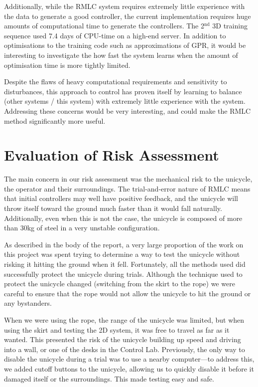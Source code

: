 \documentclass{IIBproject}
\begin{document}
Additionally, while the RMLC system requires extremely little experience with
the data to generate a good controller, the current implementation requires
huge amounts of computational time to generate the controllers. The
2$^\textrm{nd}$ 3D training sequence used 7.4 days of CPU-time on a high-end
server. In addition to optimisations to the training code such as
approximations of GPR, it would be interesting to investigate the how fast the
system learns when the amount of optimisation time is more tightly limited.

Despite the flaws of heavy computational requirements and sensitivity to
disturbances, this approach to control has proven itself by learning to
balance (other systems / this system) with extremely little experience with
the system. Addressing these concerns would be very interesting, and could
make the RMLC method significantly more useful.




\pagebreak
\appendix

\section{Evaluation of Risk Assessment}

The main concern in our risk assessment was the mechanical risk to the
unicycle, the operator and their surroundings. The trial-and-error nature of
RMLC means that initial controllers may well have positive feedback, and the
unicycle will throw itself toward the ground much faster than it would fall
naturally. Additionally, even when this is not the case, the unicycle is
composed of more than 30kg of steel in a very unstable configuration.

As described in the body of the report, a very large proportion of the work on
this project was spent trying to determine a way to test the unicycle without
risking it hitting the ground when it fell. Fortunately, all the methods used
did successfully protect the unicycle during trials. Although the technique
used to protect the unicycle changed (switching from the skirt to the rope) we
were careful to ensure that the rope would not allow the unicycle to hit the
ground or any bystanders.

When we were using the rope, the range of the unicycle was limited, but when
using the skirt and testing the 2D system, it was free to travel as far as it
wanted. This presented the risk of the unicycle building up speed and driving
into a wall, or one of the desks in the Control Lab. Previously, the only way
to disable the unicycle during a trial was to use a nearby computer---to
address this, we added cutoff buttons to the unicycle, allowing us to quickly
disable it before it damaged itself or the surroundings. This made testing
easy and safe.
\end{document}
